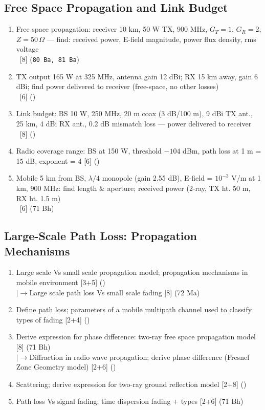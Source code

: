 \documentclass[12pt]{article}
\newcommand{\lb}{\\$\left|\rightarrow\right.$}
\newcommand{\enter}{\\\textcolor{white}{1}}
\begin{document}
  \subsection{Free Space Propagation and Link Budget}
    \begin{enumerate}[topsep=0pt, noitemsep]
      \item Free space propagation: receiver 10 km, 50 W TX, 900 MHz,
        $G_T{=}1$, $G_R{=}2$, $Z{=}50\,\Omega$ ---
        find: received power, E-field magnitude, power flux density, rms voltage
        \enter\hfill [8] (\texttt{80 Ba, 81 Ba})
      \item TX output 165 W at 325 MHz, antenna gain 12 dBi; RX 15 km away, gain 6 dBi;
        find power delivered to receiver (free-space, no other losses)
        \enter\hfill [6] ()
      \item Link budget: BS 10 W, 250 MHz, 20 m coax (3 dB/100 m), 9 dBi TX ant.,
        25 km, 4 dBi RX ant., 0.2 dB mismatch loss --- power delivered to receiver
        \enter\hfill [8] ()
      \item Radio coverage range: BS at 150 W, threshold $-104$ dBm,
        path loss at 1 m = 15 dB, exponent = 4 \hfill [6] ()
      \item Mobile 5 km from BS, $\lambda/4$ monopole (gain 2.55 dB),
        E-field = $10^{-3}$ V/m at 1 km, 900 MHz:
        find length \& aperture; received power (2-ray, TX ht. 50 m, RX ht. 1.5 m)
        \enter\hfill [6] (71 Bh)
    \end{enumerate}

  \subsection{Large-Scale Path Loss: Propagation Mechanisms}
    \begin{enumerate}[topsep=0pt, noitemsep]
      \item Large scale Vs small scale propagation model;
        propagation mechanisms in mobile environment \hfill [3+5] ()
        \lb Large scale path loss Vs small scale fading \hfill [8] (72 Ma)
      \item Define path loss; parameters of a mobile multipath channel used to classify types of fading \hfill [2+4] ()
      \item Derive expression for phase difference: two-ray free space propagation model \hfill [8] (71 Bh)
        \lb Diffraction in radio wave propagation; derive phase difference
        (Fresnel Zone Geometry model) \hfill [2+6] ()
      \item Scattering; derive expression for two-ray ground reflection model \hfill [2+8] ()
      \item Path loss Vs signal fading; time dispersion fading + types \hfill [2+6] (71 Bh)
    \end{enumerate}
\end{document}
